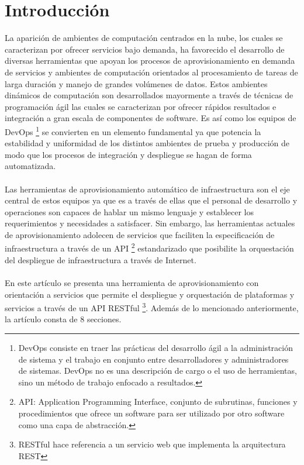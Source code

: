 \documentclass[conference, spanish]{IEEEtran}
\begin{document}
\section{Introducción}
La aparición de ambientes de computación centrados en la nube, los cuales se caracterizan por ofrecer servicios bajo demanda, ha favorecido el desarrollo de diversas herramientas que apoyan los procesos de aprovisionamiento en demanda de servicios y ambientes de computación orientados al procesamiento de tareas de larga duración y manejo de grandes volúmenes de datos. Estos ambientes dinámicos de computación son desarrollados mayormente a través de técnicas de programación ágil las cuales se caracterizan por ofrecer rápidos resultados e integración a gran escala de componentes de software. Es así como los equipos de DevOps \footnote{DevOps consiste en traer las prácticas del desarrollo ágil a la administración de sistema y el trabajo en conjunto entre desarrolladores y administradores de sistemas. DevOps no es una descripción de cargo o el uso de herramientas, sino un método de trabajo enfocado a resultados.} se convierten en un elemento fundamental ya que potencia la estabilidad y uniformidad de los distintos ambientes de prueba y producción de modo que los procesos de integración y despliegue se hagan de forma automatizada. \\
\\
Las herramientas de aprovisionamiento automático de infraestructura son el eje central de estos equipos ya que es a través de ellas que el personal de desarrollo y operaciones son capaces de hablar un mismo lenguaje y establecer los requerimientos y necesidades a satisfacer. Sin embargo, las herramientas actuales de aprovisionamiento adolecen de servicios que faciliten la especificación de infraestructura a través de un API \footnote{ API: Application Programming Interface, conjunto de subrutinas, funciones y procedimientos que ofrece un software para ser utilizado por otro software como una capa de abstracción.} estandarizado que posibilite la orquestación del despliegue de infraestructura a través de Internet.\\
\\
En este artículo se presenta una herramienta de aprovisionamiento con orientación a servicios que permite el despliegue y orquestación de plataformas y servicios a través de un API RESTful \footnote{RESTful hace referencia a un servicio web que implementa la arquitectura REST}. Además de lo mencionado anteriormente, la artículo consta de 8 secciones.\\
\end{document}
